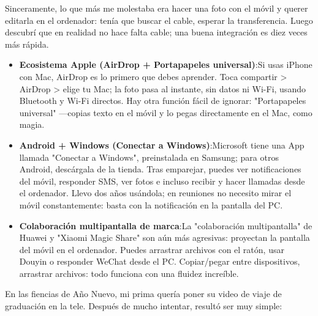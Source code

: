 


Sinceramente, lo que más me molestaba era hacer una foto con el móvil y querer editarla en el ordenador: tenía que buscar el cable, esperar la transferencia. Luego descubrí que en realidad no hace falta cable; una buena integración es diez veces más rápida.

\begin{itemize}
  \item \textbf{Ecosistema Apple (AirDrop + Portapapeles universal)}:Si usas iPhone con Mac, AirDrop es lo primero que debes aprender. Toca compartir > AirDrop > elige tu Mac; la foto pasa al instante, sin datos ni Wi-Fi, usando Bluetooth y Wi-Fi directos. Hay otra función fácil de ignorar: "Portapapeles universal" —copias texto en el móvil y lo pegas directamente en el Mac, como magia.
  \item \textbf{Android + Windows (Conectar a Windows)}:Microsoft tiene una App llamada "Conectar a Windows", preinstalada en Samsung; para otros Android, descárgala de la tienda. Tras emparejar, puedes ver notificaciones del móvil, responder SMS, ver fotos e incluso recibir y hacer llamadas desde el ordenador. Llevo dos años usándola; en reuniones no necesito mirar el móvil constantemente: basta con la notificación en la pantalla del PC.
  \item \textbf{Colaboración multipantalla de marca}:La "colaboración multipantalla" de Huawei y "Xiaomi Magic Share" son aún más agresivas: proyectan la pantalla del móvil en el ordenador. Puedes arrastrar archivos con el ratón, usar Douyin o responder WeChat desde el PC. Copiar/pegar entre dispositivos, arrastrar archivos: todo funciona con una fluidez increíble.
\end{itemize}


En las fiencias de Año Nuevo, mi prima quería poner su video de viaje de graduación en la tele. Después de mucho intentar, resultó ser muy simple:

